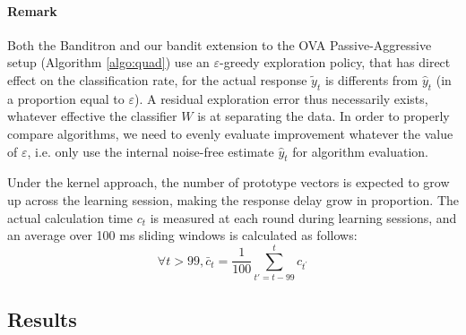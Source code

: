 \documentclass[preprint,12pt,authoryear]{elsarticle}
\begin{document}
\paragraph{Remark} Both the Banditron and our bandit extension to the OVA Passive-Aggressive setup (Algorithm \ref{algo:quad}) use an $\varepsilon$-greedy exploration policy, that has direct effect on the  classification rate, for the actual response  $\tilde{y}_t$ is differents from $\hat{y}_t$ (in a proportion equal to $\varepsilon$). A residual exploration error thus necessarily exists, whatever effective the classifier $W$ is at separating the data. In order to properly compare algorithms, we need to evenly evaluate improvement whatever the value of $\varepsilon$, i.e. only use the internal noise-free estimate $\hat{y}_t$ for algorithm evaluation.


Under the kernel approach, the number of prototype vectors is expected to grow up across the learning session, making the response delay grow in proportion. The actual calculation time $c_t$ is measured at each round during learning sessions, and an average over 100 ms sliding windows is calculated as follows:
 $$\forall t>99, \bar{c}_t = \frac{1}{100} \sum_{t'=t - 99}^t c_{t^\prime}$$

\subsection{Results}
\end{document}
